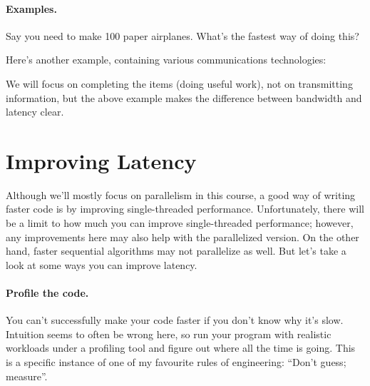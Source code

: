 \paragraph{Examples.} Say you need to make
100 paper airplanes. What's the fastest way of doing this?

\vspace*{7em}

Here's another example, containing various communications technologies:

\begin{center}
\end{center}


We will focus on completing the items (doing useful work), not on transmitting information, but the above example makes the difference between bandwidth and latency clear.

\section*{Improving Latency}
Although we'll mostly focus on parallelism in this course, a
good way of writing faster code is by improving single-threaded 
performance. Unfortunately, there will be a limit to how much you can
improve single-threaded performance; however, any improvements here
may also help with the parallelized version. On the other hand, faster
sequential algorithms may not parallelize as well. But let's take a look at some
ways you can improve latency.

\paragraph{Profile the code.} You can't successfully make your code 
faster if you don't know why it's slow. Intuition seems to often be
wrong here, so run your program with realistic workloads under a profiling
tool and figure out where all the time is going. This is a specific instance of one of my favourite rules of engineering: ``Don't guess; measure''. 

